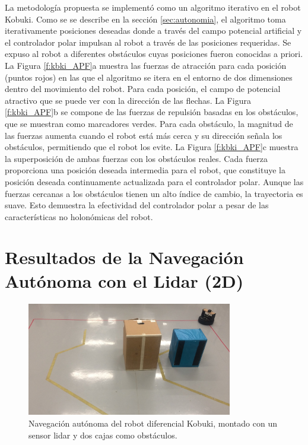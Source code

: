 La metodología propuesta se implementó como un algoritmo iterativo en el robot Kobuki. 
Como se se describe en la sección \ref{sec:autonomia}, el algoritmo toma iterativamente 
posiciones deseadas  donde a través del campo potencial artificial y el controlador 
polar impulsan al robot a través de las posiciones requeridas. Se expuso al robot 
a diferentes obstáculos cuyas posiciones fueron conocidas a priori. La Figura 
\ref{f:kbki_APF}a muestra las fuerzas de atracción para cada posición (puntos rojos) en 
las que el algoritmo se itera en el entorno de dos dimensiones dentro del movimiento del 
robot. Para cada posición, el campo de potencial atractivo que se puede ver con la dirección 
de las flechas. La Figura \ref{f:kbki_APF}b se compone de las fuerzas de repulsión basadas en 
los obstáculos, que se muestran como marcadores verdes. Para cada obstáculo, la magnitud de 
las fuerzas aumenta cuando el robot está más cerca y su dirección señala los obstáculos, permitiendo 
que el robot los evite. La Figura \ref{f:kbki_APF}c muestra la superposición de ambas fuerzas 
con los obstáculos reales. Cada fuerza proporciona una posición deseada intermedia para el 
robot, que constituye la posición deseada continuamente actualizada para el controlador 
polar. Aunque las fuerzas cercanas a los obstáculos tienen un alto índice de cambio, la 
trayectoria es suave. Esto demuestra la efectividad del controlador polar a pesar de las 
características no holonómicas del robot.

\section{Resultados de la Navegación Autónoma con el Lidar (2D)}
\begin{figure}%
  \centering \footnotesize
  \includegraphics[width=0.80\textwidth]{images/kobuki_201.jpg}
  \captionsetup{font=footnotesize}
  \caption{Navegación autónoma del robot diferencial Kobuki, montado con un sensor lidar y dos cajas
  como obstáculos.}
\end{figure}


